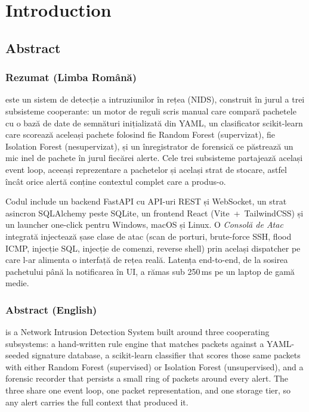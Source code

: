 \chapter{Introduction}
\label{chap:introduction}

\section{Abstract}
\label{sec:abstract}

\subsection*{Rezumat (Limba Română)}

\nidsname{} este un sistem de detecție a intruziunilor în rețea
(NIDS), construit în jurul a trei subsisteme cooperante: un motor
de reguli scris manual care compară pachetele cu o bază de date
de semnături inițializată din YAML, un clasificator scikit-learn
care scorează aceleași pachete folosind fie Random Forest
(supervizat), fie Isolation Forest (nesupervizat), și un
înregistrator de forensică ce păstrează un mic inel de pachete în
jurul fiecărei alerte. Cele trei subsisteme partajează același
event loop, aceeași reprezentare a pachetelor și același strat
de stocare, astfel încât orice alertă conține contextul complet
care a produs-o.

Codul include un backend FastAPI cu API-uri REST și WebSocket, un
strat asincron SQLAlchemy peste SQLite, un frontend React
(Vite~+~TailwindCSS) și un launcher one-click pentru Windows,
macOS și Linux. O \emph{Consolă de Atac} integrată injectează
șase clase de atac (scan de porturi, brute-force SSH, flood ICMP,
injecție SQL, injecție de comenzi, reverse shell) prin același
dispatcher pe care l-ar alimenta o interfață de rețea reală.
Latența end-to-end, de la sosirea pachetului până la notificarea
în UI, a rămas sub 250\,ms pe un laptop de gamă medie.

\subsection*{Abstract (English)}

\nidsname{} is a Network Intrusion Detection System built around
three cooperating subsystems: a hand-written rule engine that
matches packets against a YAML-seeded signature database, a
scikit-learn classifier that scores those same packets with
either Random Forest (supervised) or Isolation Forest
(unsupervised), and a forensic recorder that persists a small
ring of packets around every alert. The three share one event
loop, one packet representation, and one storage tier, so any
alert carries the full context that produced it.


